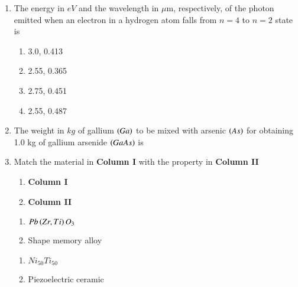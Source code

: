 \documentclass[journal,12pt,onecolumn]{IEEEtran}
\theoremstyle{remark}
\begin{document}
\begin{enumerate}
    \item The energy in $eV$ and the wavelength in $\mu$m, respectively, of the photon emitted when an electron
        in a hydrogen atom falls from $n = 4$ to $n = 2$ state is
        \hfill{}
        \begin{multicols}{4}
            \begin{enumerate}
                \item  3.0, 0.413 \columnbreak
                \item  2.55, 0.365 \columnbreak
                \item  2.75, 0.451  \columnbreak
                \item  2.55, 0.487
            \end{enumerate}
        \end{multicols}

    \item  The weight in $kg$ of gallium $\left(Ga\right)$ to be mixed with arsenic $\left(As\right)$ for obtaining 1.0 kg of gallium
        arsenide $\left(GaAs\right)$ is
        \hfill{}

    \item Match the material in \textbf{Column I} with the property in \textbf{Column II}
        \begin{multicols}{2}
            \begin{enumerate}
                \item[] \textbf{Column I} \columnbreak
                \item[] \textbf{Column II}
            \end{enumerate}
        \end{multicols}


        \begin{multicols}{2}
            \begin{enumerate}
                \item[P.]  $Pb\left(Zr, Ti\right)O_3$\columnbreak
                \item[1.] Shape memory alloy
            \end{enumerate}

        \end{multicols}
        \begin{multicols}{2}
            \begin{enumerate}
                \item[Q.] $Ni_{50}Ti_{50} $\columnbreak
                \item[2.] Piezoelectric ceramic
            \end{enumerate}


\end{multicols}
\end{enumerate}
\end{document}
